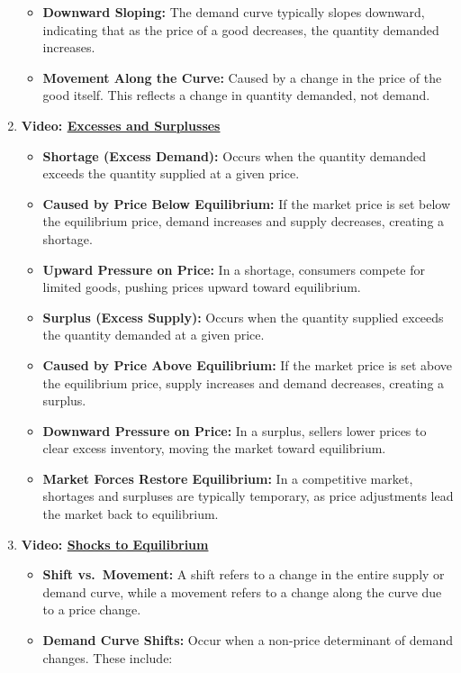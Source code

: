 \documentclass[
]{book}
\providecommand{\tightlist}{%
  \setlength{\itemsep}{0pt}\setlength{\parskip}{0pt}}
\begin{document}
\begin{enumerate}
  \begin{itemize}
  \tightlist
  \item
    \textbf{Downward Sloping:} The demand curve typically slopes downward, indicating that as the price of a good decreases, the quantity demanded increases.
  \item
    \textbf{Movement Along the Curve:} Caused by a change in the price of the good itself. This reflects a change in quantity demanded, not demand.
  \end{itemize}
\item
  \textbf{Video: \href{https://www.youtube.com/watch?v=7eZcPs9z9OA}{Excesses and Surplusses}}

  \begin{itemize}
  \tightlist
  \item
    \textbf{Shortage (Excess Demand):} Occurs when the quantity demanded exceeds the quantity supplied at a given price.\\
  \item
    \textbf{Caused by Price Below Equilibrium:} If the market price is set below the equilibrium price, demand increases and supply decreases, creating a shortage.\\
  \item
    \textbf{Upward Pressure on Price:} In a shortage, consumers compete for limited goods, pushing prices upward toward equilibrium.
  \item
    \textbf{Surplus (Excess Supply):} Occurs when the quantity supplied exceeds the quantity demanded at a given price.
  \item
    \textbf{Caused by Price Above Equilibrium:} If the market price is set above the equilibrium price, supply increases and demand decreases, creating a surplus.
  \item
    \textbf{Downward Pressure on Price:} In a surplus, sellers lower prices to clear excess inventory, moving the market toward equilibrium.
  \item
    \textbf{Market Forces Restore Equilibrium:} In a competitive market, shortages and surpluses are typically temporary, as price adjustments lead the market back to equilibrium.
  \end{itemize}
\item
  \textbf{Video: \href{https://www.youtube.com/watch?v=6dwSIO_Slhc}{Shocks to Equilibrium}}

  \begin{itemize}
  \tightlist
  \item
    \textbf{Shift vs.~Movement:} A shift refers to a change in the entire supply or demand curve, while a movement refers to a change along the curve due to a price change.
  \item
    \textbf{Demand Curve Shifts:} Occur when a non-price determinant of demand changes. These include:


\end{itemize}
\end{enumerate}
\end{document}
